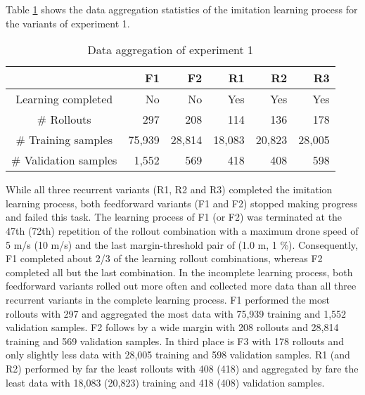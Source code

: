 Table \ref{tab:e1_data} shows the data aggregation statistics 
of the imitation learning process for the variants of experiment 1.
\begin{table}[h]
    \caption[
        Data aggregation of experiment 1
    ]{
        Data aggregation of experiment 1
        \label{tab:e1_data}}        
    \centering
    \begin{tabular}{|c|r|r|r|r|r|} 
        \cline{2-6}
        \multicolumn{1}{c|}{}
        &F1
        &F2
        &R1
        &R2
        &R3
        \\\hline
        Learning completed
        &No
        &No
        &Yes
        &Yes
        &Yes
        \\\hline
        \# Rollouts
        &297
        &208
        &114
        &136
        &178
        \\\hline
        \# Training samples
        &75,939
        &28,814
        &18,083
        &20,823
        &28,005
        \\\hline
        \# Validation samples
        &1,552
        &569
        &418
        &408
        &598
        \\\hline
    \end{tabular}
\end{table}
While all three recurrent variants (R1, R2 and R3)
completed the imitation learning process,
both feedforward variants (F1 and F2) stopped making progress and failed this task.
The learning process of F1 (or F2) was terminated 
at the 47th (72th) repetition of the rollout combination
with a maximum drone speed of 5 m/s (10 m/s) and the last margin-threshold pair of (1.0 m, 1 \%).
Consequently, F1 completed about 2/3 of the learning rollout combinations,
whereas F2 completed all but the last combination.
In the incomplete learning process, 
both feedforward variants rolled out more often
and collected more data
than all three recurrent variants in the complete learning process.
F1 performed the most rollouts with 297
and aggregated the most data with 75,939 training and 1,552 validation samples.
F2 follows by a wide margin with 208 rollouts
and 28,814 training and 569 validation samples.
In third place is F3 with 178 rollouts 
and only slightly less data with 28,005 training and 598 validation samples.
R1 (and R2) performed by far the least rollouts with 408 (418)
and aggregated by fare the least data 
with 18,083 (20,823) training and 418 (408) validation samples.






